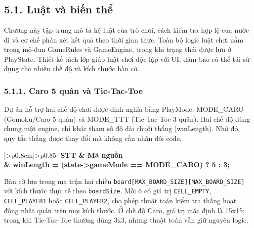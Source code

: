 \newpage
\chapter*{}
\setlength{\parindent}{1.5em}

\section*{5.1. Luật và biến thể}

\setlength{\parindent}{1.5em} Chương này tập trung mô tả hệ luật của trò chơi, cách kiểm tra hợp lệ của nước đi và cơ chế phán xét kết quả theo thời gian thực. Toàn bộ logic luật chơi nằm trong mô-đun GameRules và GameEngine, trong khi trạng thái được lưu ở PlayState. Thiết kế tách lớp giúp luật chơi độc lập với UI, đảm bảo có thể tái sử dụng cho nhiều chế độ và kích thước bàn cờ.

\subsection*{5.1.1. Caro 5 quân và Tic-Tac-Toe}

\setlength{\parindent}{1.5em} Dự án hỗ trợ hai chế độ chơi được định nghĩa bằng PlayMode: MODE\_CARO (Gomoku/Caro 5 quân) và MODE\_TTT (Tic-Tac-Toe 3 quân). Hai chế độ dùng chung một engine, chỉ khác tham số độ dài chuỗi thắng (winLength). Nhờ đó, quy tắc thắng được thay đổi mà không cần nhân đôi code.

\captionsetup{type=lstlisting}
\renewcommand{\arraystretch}{0.8}
\label{lst:ch5_win_length}
\begin{longtable}{|>{\ttfamily\small\color{black}\raggedleft\arraybackslash}p{0.8cm}|>{\ttfamily\small\color{black}\arraybackslash}p{0.85\linewidth}|}
\hline
\normalfont\bfseries STT & \normalfont\bfseries Mã nguồn \\  &   winLength = (state->gameMode == MODE\_CARO) ? 5 : 3; \\ \hline
\end{longtable}

\setlength{\parindent}{1.5em} Bàn cờ lưu trong ma trận hai chiều \texttt{board[MAX\_BOARD\_SIZE][MAX\_BOARD\_SIZE]} với kích thước thực tế theo \texttt{boardSize}. Mỗi ô có giá trị \texttt{CELL\_EMPTY}, \texttt{CELL\_PLAYER1} hoặc \texttt{CELL\_PLAYER2}, cho phép thuật toán kiểm tra thắng hoạt động nhất quán trên mọi kích thước. Ở chế độ Caro, giá trị mặc định là 15x15; trong khi Tic-Tac-Toe thường dùng 3x3, nhưng thuật toán vẫn giữ nguyên logic.

